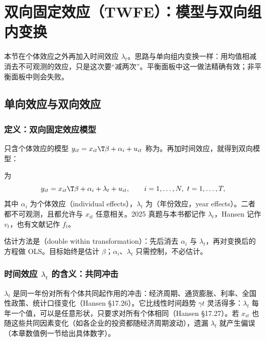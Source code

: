 \section{双向固定效应（TWFE）：模型与双向组内变换}\label{sec:U10b-twfe}

本节在个体效应之外再加入时间效应 $\lambda_t$。思路与单向组内变换一样：用均值相减消去不可观测的效应，只是这次要“减两次”。平衡面板中这一做法精确有效；非平衡面板中则会失败。

\subsection{单向效应与双向效应}

\subsubsection{定义：双向固定效应模型}

只含个体效应的模型 $y_{it}=x_{it}\T\beta+\alpha_i+u_{it}$ 称为。再加时间效应，就得到双向模型：

\begin{defn}[双向固定效应模型]\label{def:U10b-twfe}
为
\begin{equation}\label{eq:U10b-twfe}
y_{it}=x_{it}\T\beta+\alpha_i+\lambda_t+u_{it},\qquad i=1,\dots,N,\ t=1,\dots,T,
\end{equation}
其中 $\alpha_i$ 为个体效应（individual effects），$\lambda_t$ 为（年份效应，year effects）。二者都不可观测，且都允许与 $x_{it}$ 任意相关。2025 真题与本书都记作 $\lambda_t$，Hansen 记作 $v_t$，也有文献记作 $f_t$。
\end{defn}

估计方法是（double within transformation）：先后消去 $\alpha_i$ 与 $\lambda_t$，再对变换后的方程做 OLS。目标始终是估计 $\beta$；$\alpha_i$、$\lambda_t$ 只需控制，不必估计。

\subsubsection{时间效应 \texorpdfstring{$\lambda_t$}{lambda\_t} 的含义：共同冲击}

$\lambda_t$ 是同一年份对所有个体共同起作用的冲击：经济周期、通货膨胀、利率、全国性政策、统计口径变化（Hansen §17.26）。它比线性时间趋势 $\gamma t$ 灵活得多：$\lambda_t$ 每年一个值，可以是任意形状，只要求对所有个体相同（Hansen §17.27）。若 $x_{it}$ 也随这些共同因素变化（如各企业的投资都随经济周期波动），遗漏 $\lambda_t$ 就产生偏误（本章数值例一节给出具体数字）。

